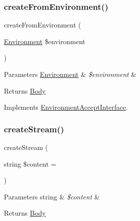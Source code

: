 \subsubsection{\texorpdfstring{create\+From\+Environment()}{createFromEnvironment()}}
{\footnotesize\ttfamily create\+From\+Environment (\begin{DoxyParamCaption}\item[{\mbox{\hyperlink{class_pes_1_1_http_1_1_environment}{Environment}}}]{\$environment }\end{DoxyParamCaption})}


\begin{DoxyParams}[1]{Parameters}
\mbox{\hyperlink{class_pes_1_1_http_1_1_environment}{Environment}} & {\em \$environment} & \\
\hline
\end{DoxyParams}
\begin{DoxyReturn}{Returns}
\mbox{\hyperlink{class_pes_1_1_http_1_1_body}{Body}} 
\end{DoxyReturn}


Implements \mbox{\hyperlink{interface_pes_1_1_http_1_1_factory_1_1_environment_accept_interface}{Environment\+Accept\+Interface}}.

\mbox{\label{class_pes_1_1_http_1_1_factory_1_1_body_factory_a96eb3d011c550a6eb1c3702b72f8cc43}} 
\subsubsection{\texorpdfstring{create\+Stream()}{createStream()}}
{\footnotesize\ttfamily create\+Stream (\begin{DoxyParamCaption}\item[{string}]{\$content = {\ttfamily \textquotesingle{}\textquotesingle{}} }\end{DoxyParamCaption})}


\begin{DoxyParams}[1]{Parameters}
string & {\em \$content} & \\
\hline
\end{DoxyParams}
\begin{DoxyReturn}{Returns}
\mbox{\hyperlink{class_pes_1_1_http_1_1_body}{Body}} 
\end{DoxyReturn}
\mbox{\label{class_pes_1_1_http_1_1_factory_1_1_body_factory_adacc68c99115420e3c25ad402e58b2cd}} 

